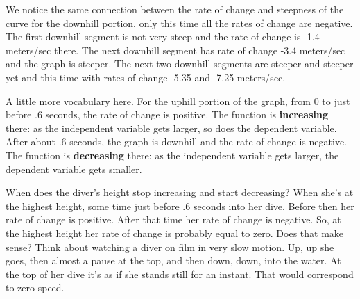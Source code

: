 We notice the same connection between the rate of change and steepness of the curve for the downhill portion, only this time all the rates of change are negative.  The first downhill segment is not very steep and the rate of change is -1.4 meters/sec there.  The next downhill segment has rate of change -3.4 meters/sec and the graph is steeper.  The next two downhill segments are steeper and steeper yet and this time with rates of change -5.35 and -7.25 meters/sec.

A little more vocabulary here.  For the uphill portion of the graph, from 0 to just before .6 seconds, the rate of change is positive.  The function is \textbf{increasing} there:  as the independent variable gets larger, so does the dependent variable. After about .6 seconds, the graph is downhill and the rate of change is negative.  The function is  \textbf{decreasing} there:  as the independent variable gets larger, the dependent variable gets smaller.

When does the diver's height stop increasing and start decreasing?  When she's at the highest height, some time just before .6 seconds into her dive.  Before then her rate of change is positive.  After that time her rate of change is negative.  So, at the highest height her rate of change is probably equal to zero.  Does that make sense?  Think about watching a diver on film in very slow motion.  Up, up she goes, then almost a pause at the top, and then down, down, into the water.  At the top of her dive it's as if she stands still for an instant.  That would correspond to zero speed.

